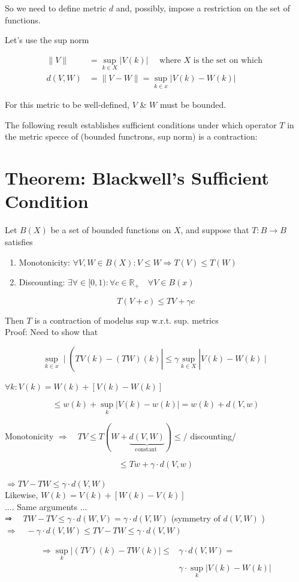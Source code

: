 \documentclass[10pt]{article}
\begin{document}
So we need to define metric $d$ and, possibly, impose a restriction on the set of functions.

Let's use the sup norm

$$
\begin{aligned}
\|V\| & =\sup _{k \in X}|V(k)| \quad \text { where } X \text { is the set on which } \\
d(V, W) & =\|V-W\|=\sup _{k \in x}|V(k)-W(k)|
\end{aligned}
$$

For this metric to be well-defined, $V$ \& $W$ must be bounded.

The following result establishes sufficient conditions under which operator $T$ in the metric specce of (bounded functrons, sup norm) is a contraction:

\section*{Theorem: Blackwell's Sufficient Condition}
Let $B(X)$ be a set of bounded functions on $X$, and suppose that $T: B \rightarrow B$ satisfies

\begin{enumerate}
  \item Monotonicity: $\forall V, W \in B(X): V \leq W \Rightarrow T(V) \leq T(W)$
  \item Discounting: $\exists \forall \in[0,1): \forall c \in \mathbb{R}_{+} \quad \forall V \in B(x)$
\end{enumerate}

$$
T(V+c) \leqslant T V+\gamma c
$$

Then $T$ is a contraction of modelus sup w.r.t. sup. metrics\\
Proof: Need to show that

$$
\sup _{k \in x} \mid\left(T V(k)-(T W)(k)\left|\leqslant \gamma \sup _{k \in X}\right| V(k)-W(k) \mid\right.
$$

$\forall k: V(k)=W(k)+[V(k)-W(k)]$

$$
\leq w(k)+\sup _{k}|V(k)-w(k)|=w(k)+d(V, w)
$$

Monotonicity $\Rightarrow \quad T V \leq T(W+\underbrace{d(V, W)}_{\text {constant }}) \leqslant /$ discounting/

$$
\leq T w+\gamma \cdot d(V, w)
$$

$\Rightarrow T V-T W \leq \gamma \cdot d(V, W)$\\
Likewise, $W(k)=V(k)+[W(k)-V(k)]$\\
.... Same arguments ...\\
⇒ $\quad T W-T V \leq \gamma \cdot d(W, V)=\gamma \cdot d(V, W)$ (symmetry of $d(V, W)$ )\\
$\Rightarrow \quad-\gamma \cdot d(V, W) \leq T V-T W \leq \gamma \cdot d(V, W)$

$$
\begin{aligned}
\Rightarrow \sup _{k}|(T V)(k)-T W(k)| \leqslant & \gamma \cdot d(V, W)= \\
& \gamma \cdot \sup _{k}|V(k)-W(k)|
\end{aligned}
$$
\end{document}
